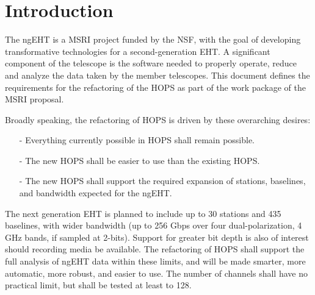 %
%

\section{Introduction}
\label{sec:intro}


The \ac{ngEHT} is a \ac{MSRI} project funded by the \ac{NSF}, with the goal of developing
transformative technologies for a second-generation \ac{EHT}. A significant
component of the telescope is the software needed to properly
operate, reduce and analyze the data taken by the member telescopes.
This document defines the requirements for the refactoring of the \ac{HOPS}
as part of the work package of the \acs{MSRI} proposal. 

Broadly speaking, the refactoring of \acs{HOPS} is driven by
these overarching desires:

\begin{itemize}
\item[-] Everything currently possible in \ac{HOPS} shall remain possible.

\item[-] The new \ac{HOPS} shall be easier to use than the existing \acs{HOPS}.
 
\item[-] The new \acs{HOPS} shall support the required expansion of stations, 
baselines, and bandwidth expected for the ngEHT.

\end{itemize}

The next generation \acs{EHT} is planned to include up to 30 stations
and 435 baselines, with wider bandwidth (up to 256 Gbps over four dual-polarization, 4 GHz bands, if sampled at 2-bits). 
Support for greater bit depth is also of interest should recording media be available.  The refactoring
of \ac{HOPS} shall support the full analysis of ngEHT data within these limits,
and will be made smarter, more automatic, more robust, and easier to use. The
number of channels shall have no practical limit, but shall be tested at least to 128.

